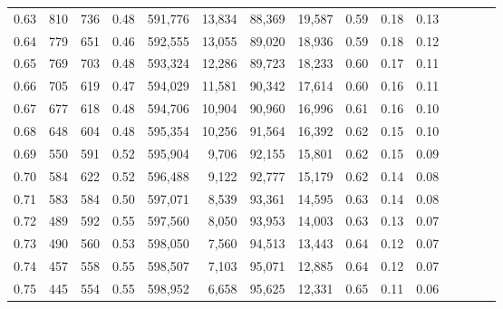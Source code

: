 \begin{tabular}{rrrcrrrrrrrrrrr}
0.63 &     810 &    736 &                                       0.48 &  591,776 &   13,834 &   88,369 &   19,587 &  0.59 &  0.18 &                         0.13 \\
0.64 &     779 &    651 &                                       0.46 &  592,555 &   13,055 &   89,020 &   18,936 &  0.59 &  0.18 &                         0.12 \\
0.65 &     769 &    703 &                                       0.48 &  593,324 &   12,286 &   89,723 &   18,233 &  0.60 &  0.17 &                         0.11 \\
0.66 &     705 &    619 &                                       0.47 &  594,029 &   11,581 &   90,342 &   17,614 &  0.60 &  0.16 &                         0.11 \\
0.67 &     677 &    618 &                                       0.48 &  594,706 &   10,904 &   90,960 &   16,996 &  0.61 &  0.16 &                         0.10 \\
0.68 &     648 &    604 &                                       0.48 &  595,354 &   10,256 &   91,564 &   16,392 &  0.62 &  0.15 &                         0.10 \\
0.69 &     550 &    591 &                                       0.52 &  595,904 &    9,706 &   92,155 &   15,801 &  0.62 &  0.15 &                         0.09 \\
0.70 &     584 &    622 &                                       0.52 &  596,488 &    9,122 &   92,777 &   15,179 &  0.62 &  0.14 &                         0.08 \\
0.71 &     583 &    584 &                                       0.50 &  597,071 &    8,539 &   93,361 &   14,595 &  0.63 &  0.14 &                         0.08 \\
0.72 &     489 &    592 &                                       0.55 &  597,560 &    8,050 &   93,953 &   14,003 &  0.63 &  0.13 &                         0.07 \\
0.73 &     490 &    560 &                                       0.53 &  598,050 &    7,560 &   94,513 &   13,443 &  0.64 &  0.12 &                         0.07 \\
0.74 &     457 &    558 &                                       0.55 &  598,507 &    7,103 &   95,071 &   12,885 &  0.64 &  0.12 &                         0.07 \\
0.75 &     445 &    554 &                                       0.55 &  598,952 &    6,658 &   95,625 &   12,331 &  0.65 &  0.11 &                         0.06 \\

\end{tabular}
